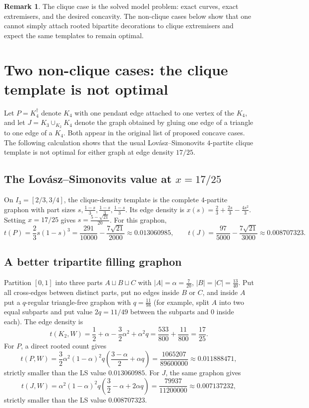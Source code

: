 \documentclass[11pt]{amsart}
\theoremstyle{definition}
\newtheorem{remark}[theorem]{Remark}
\newcommand{\1}{\mathbf 1}
\begin{document}
\begin{remark}
The clique case is the solved model problem: exact curves, exact extremisers,
and the desired concavity.  The non-clique cases below show that one cannot
simply attach rooted bipartite decorations to clique extremisers and expect the
same templates to remain optimal.
\end{remark}

\section{Two non-clique cases: the clique template is not optimal}
\label{sec:nonclique}

Let $P=K_4^\dagger$ denote $K_4$ with one pendant edge attached to one vertex of
the $K_4$, and let $J=K_3\cup_{K_2}K_4$ denote the graph obtained by gluing one
edge of a triangle to one edge of a $K_4$.  Both appear in the original list of
proposed concave cases.  The following calculation shows that the usual
Lov\'asz--Simonovits $4$-partite clique template is not optimal for either graph
at edge density $17/25$.

\subsection{The Lov\'asz--Simonovits value at $x=17/25$}

On $I_3=[2/3,3/4]$, the clique-density template is the complete $4$-partite
graphon with part sizes $s,\frac{1-s}{3},\frac{1-s}{3},\frac{1-s}{3}$.  Its edge
density is $x(s)=\frac23+\frac{2s}{3}-\frac{4s^2}{3}$.  Setting $x=17/25$ gives
$s=\frac{5-\sqrt{21}}{20}$.  For this graphon,
\[
   t(P)=\frac23s(1-s)^3
   =\frac{291}{10000}-\frac{7\sqrt{21}}{2000}
   \approx 0.013060985,
   \qquad
   t(J)=\frac{97}{5000}-\frac{7\sqrt{21}}{3000}
   \approx 0.008707323.
\]

\subsection{A better tripartite filling graphon}

Partition $[0,1]$ into three parts $A\sqcup B\sqcup C$ with
$|A|=\alpha=\frac7{20}$, $|B|=|C|=\frac{13}{40}$.  Put all cross-edges between
distinct parts, put no edges inside $B$ or $C$, and inside $A$ put a $q$-regular
triangle-free graphon with $q=\frac{11}{98}$ (for example, split $A$ into two
equal subparts and put value $2q=11/49$ between the subparts and $0$ inside
each).  The edge density is
\[
   t(K_2,W)=\frac12+\alpha-\frac32\alpha^2+\alpha^2q
   =\frac{533}{800}+\frac{11}{800}=\frac{17}{25}.
\]
For $P$, a direct rooted count gives
\[
   t(P,W)=\frac32\alpha^2(1-\alpha)^2q
          \left(\frac{3-\alpha}{2}+\alpha q\right)
   =\frac{1065207}{89600000}\approx 0.011888471,
\]
strictly smaller than the LS value $0.013060985$.  For $J$, the same graphon
gives
\[
   t(J,W)=\alpha^2(1-\alpha)^2q
          \left(\frac32-\alpha+2\alpha q\right)
       =\frac{79937}{11200000}\approx 0.007137232,
\]
strictly smaller than the LS value $0.008707323$.
\end{document}

